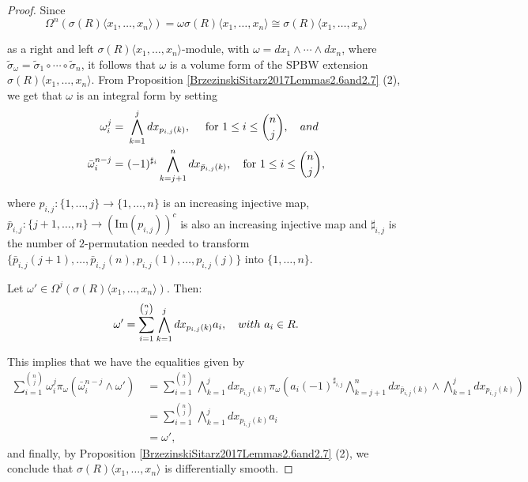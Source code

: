 \documentclass{amsart}
\theoremstyle{definition}
\theoremstyle{remark}
\numberwithin{equation}{section}
\begin{document}
\begin{proof}
Since 
\[
\Omega^{n} (\sigma(R)\langle x_1,\ldots, x_n\rangle) = \omega\sigma(R)\langle x_1,\ldots, x_n\rangle\cong \sigma(R)\langle x_1,\ldots, x_n\rangle
\] 

as a right and left $\sigma(R)\langle x_1,\ldots, x_n\rangle$-module, with $\omega=dx_1 \wedge \cdots \wedge dx_n$, where $\widetilde{\sigma}_{\omega}=\widetilde{\sigma}_{1}\circ\cdots\circ\widetilde{\sigma}_{n}$, it follows that $\omega$ is a volume form of the SPBW extension $\sigma(R)\langle x_1,\ldots, x_n\rangle$. From Proposition \ref{BrzezinskiSitarz2017Lemmas2.6and2.7} (2), we get that $\omega$ is an integral form by setting
\begin{align*}
\omega_i^j = &\ \bigwedge_{k=1}^{j}dx_{p_{i,j}(k)}, \quad \text{ for } 1\leq i \leq \binom{n}{j}, \quad {\rm and} \\
\bar{\omega}_i^{n-j} = &\ (-1)^{\sharp_i}\bigwedge_{k=j+1}^{n}dx_{\bar{p}_{i,j}(k)},  \quad \text{for}\ 1\leq i \leq \binom{n}{j},
\end{align*}

where $p_{i,j}:\{1,\ldots,j\}\rightarrow \{1,\ldots,n\}$ is an increasing injective map, $\bar{p}_{i,j}:\{j+1,\ldots,n\}\rightarrow (\text{Im}(p_{i,j}))^c$ is also an increasing injective map and $\sharp_{i,j}$ is the number of $2$-permutation needed to transform $\{\bar{p}_{i,j}(j+1),\ldots, \bar{p}_{i,j}(n),p_{i,j}(1), \ldots, p_{i,j}(j)\}$ into $\{1, \ldots, n\}$. 

Let $\omega' \in \Omega^j(\sigma(R)\langle x_1,\ldots, x_n\rangle)$. Then:
\[
\omega' = \displaystyle\sum_{i=1}^{\binom{n}{j}}\bigwedge_{k=1}^{j}dx_{p_{i,j}(k)}a_i, \quad {\rm with}\ a_i \in R.
\] 

This implies that we have the equalities given by
{\footnotesize{
    \begin{align*}
    \sum_{i=1}^{\binom{n}{j}}\omega_{i}^{j}\pi_{\omega}(\bar{\omega}_i^{n-j}\wedge \omega') &\ =\sum_{i=1}^{\binom{n}{j}}\bigwedge_{k=1}^{j}dx_{p_{i,j}(k)}\pi_{\omega}\left(a_i(-1)^{\sharp_{i,j}}\bigwedge_{k=j+1}^{n}dx_{\bar{p}_{i,j}(k)}\wedge\bigwedge_{k=1}^{j}dx_{p_{i,j}(k)}\right) \\
    &\ = \sum_{i=1}^{\binom{n}{j}}\bigwedge_{k=1}^{j}dx_{p_{i,j}(k)}a_i \\ 
    &\ = \omega', 
    \end{align*}
}}
and finally, by Proposition \ref{BrzezinskiSitarz2017Lemmas2.6and2.7} (2), we conclude that $\sigma(R)\langle x_1,\ldots, x_n\rangle$ is differentially smooth.
\end{proof}
\end{document}
